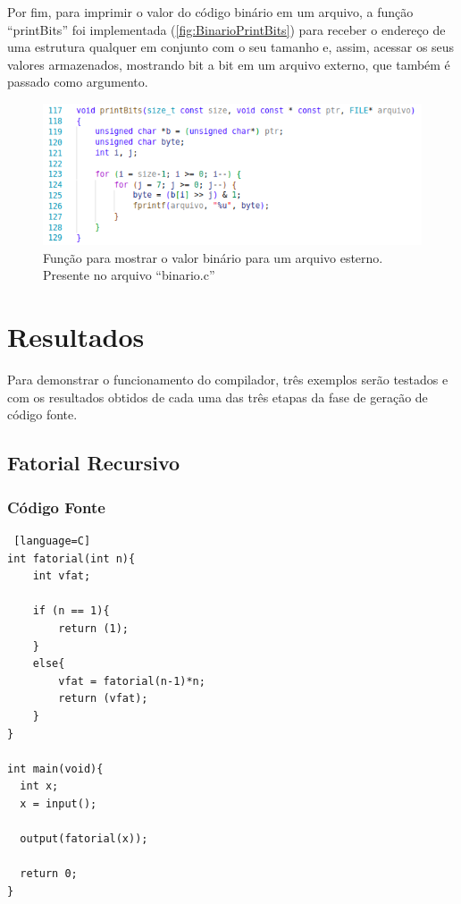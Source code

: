 \documentclass[
	12pt,				%
	oneside,
	a4paper,			%
	english,			%
	french,				%
	spanish,			%
	brazil,				%
	]{abntex2}
\begin{document}
Por fim, para imprimir o valor do código binário em um arquivo, a função ``printBits'' foi implementada (\autoref{fig:BinarioPrintBits}) para receber o endereço de uma estrutura qualquer em conjunto com o seu tamanho e, assim, acessar os seus valores armazenados, mostrando bit a bit em um arquivo externo, que também é passado como argumento. 

\begin{figure}[htbp]
\centering 
\caption{Função para mostrar o valor binário para um arquivo esterno. Presente no arquivo \nohyphens{``binario.c''}} 
\label{fig:BinarioPrintBits}
\graphicspath{ {./imgs/} } 
\includegraphics[scale=0.5]{imgs/Codigo/Binario_printbits.png}
\end{figure}

\chapter{Resultados}
Para demonstrar o funcionamento do compilador, três exemplos serão testados e com os resultados obtidos de cada uma das três etapas da fase de geração de código fonte.

\section{Fatorial Recursivo}

\subsection{Código Fonte}
\begin{lstlisting} [language=C]
int fatorial(int n){
    int vfat; 

    if (n == 1){
        return (1);
    }
    else{
        vfat = fatorial(n-1)*n;
        return (vfat);
    }
}

int main(void){
  int x;
  x = input();

  output(fatorial(x));

  return 0;
}

\end{lstlisting}
\end{document}
